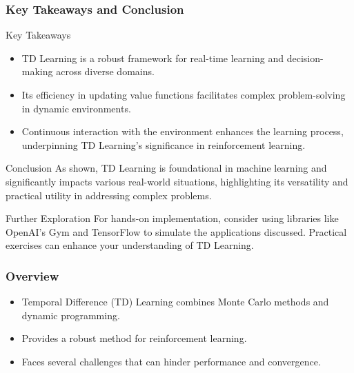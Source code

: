 \documentclass[aspectratio=169]{beamer}
\begin{document}
\begin{frame}[fragile]
  \frametitle{Key Takeaways and Conclusion}
  \begin{block}{Key Takeaways}
    \begin{itemize}
      \item TD Learning is a robust framework for real-time learning and decision-making across diverse domains.
      \item Its efficiency in updating value functions facilitates complex problem-solving in dynamic environments.
      \item Continuous interaction with the environment enhances the learning process, underpinning TD Learning's significance in reinforcement learning.
    \end{itemize}
  \end{block}

  \begin{block}{Conclusion}
    As shown, TD Learning is foundational in machine learning and significantly impacts various real-world situations, highlighting its versatility and practical utility in addressing complex problems.
  \end{block}

  \begin{block}{Further Exploration}
    For hands-on implementation, consider using libraries like OpenAI's Gym and TensorFlow to simulate the applications discussed. Practical exercises can enhance your understanding of TD Learning.
  \end{block}
\end{frame}

\begin{frame}[fragile]
    \frametitle{Overview}
    \begin{itemize}
        \item Temporal Difference (TD) Learning combines Monte Carlo methods and dynamic programming.
        \item Provides a robust method for reinforcement learning.
        \item Faces several challenges that can hinder performance and convergence.
    \end{itemize}
\end{frame}
\end{document}
